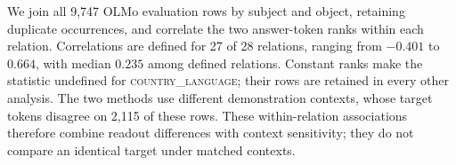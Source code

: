 We join all 9,747 OLMo evaluation rows by subject and object, retaining duplicate occurrences, and correlate the two answer-token ranks within each relation. Correlations are defined for 27 of 28 relations, ranging from $-0.401$ to $0.664$, with median $0.235$ among defined relations. Constant ranks make the statistic undefined for \textsc{country\_language}; their rows are retained in every other analysis. The two methods use different demonstration contexts, whose target tokens disagree on 2,115 of these rows. These within-relation associations therefore combine readout differences with context sensitivity; they do not compare an identical target under matched contexts.
